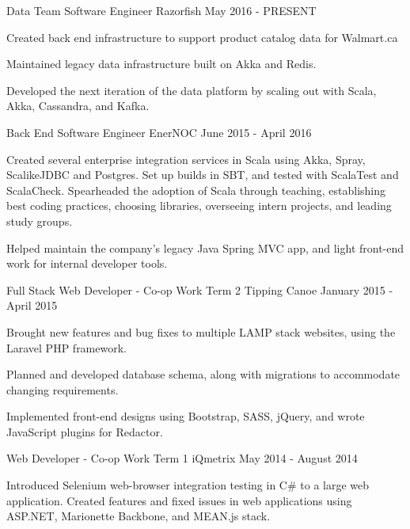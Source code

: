 \begin{cventries}
  \cventry
    {Data Team Software Engineer}
    {Razorfish}
    {\toronto}
    {May 2016 - PRESENT}
    {
      \begin{cvitems}
        \item {Created back end infrastructure to support product catalog data for Walmart.ca}
        \item {Maintained legacy data infrastructure built on Akka and Redis.}
        \item {Developed the next iteration of the data platform by scaling out with Scala, Akka, Cassandra, and Kafka.}
      \end{cvitems}
    }
  \cventry
    {Back End Software Engineer}
    {EnerNOC}
    {\vancouver}
    {June 2015 - April 2016}
    {
      \begin{cvitems}
        \item {Created several enterprise integration services in Scala using Akka, Spray, ScalikeJDBC and Postgres. Set up builds in SBT, and tested with ScalaTest and ScalaCheck. Spearheaded the adoption of Scala through teaching, establishing best coding practices, choosing libraries, overseeing intern projects, and leading study groups.}
        \item {Helped maintain the company's legacy Java Spring MVC app, and light front-end work for internal developer tools.}
      \end{cvitems}
    }
  \cventry
    {Full Stack Web Developer - Co-op Work Term 2}
    {Tipping Canoe}
    {\winnipeg}
    {January 2015 - April 2015}
    {
      \begin{cvitems}
        \item {Brought new features and bug fixes to multiple LAMP stack websites, using the Laravel PHP framework.}
        \item {Planned and developed database schema, along with migrations to accommodate changing requirements.}
        \item {Implemented front-end designs using Bootstrap, SASS, jQuery, and wrote JavaScript plugins for Redactor.}
      \end{cvitems} 
    }

  \cventry
    {Web Developer - Co-op Work Term 1}
    {iQmetrix}
    {\winnipeg}
    {May 2014 - August 2014}
    {
      \begin{cvitems}
        \item {Introduced Selenium web-browser integration testing in C\# to a large web application. Created features and fixed issues in web applications using ASP.NET, Marionette Backbone, and MEAN.js stack.}
      \end{cvitems}
    }
\end{cventries}
